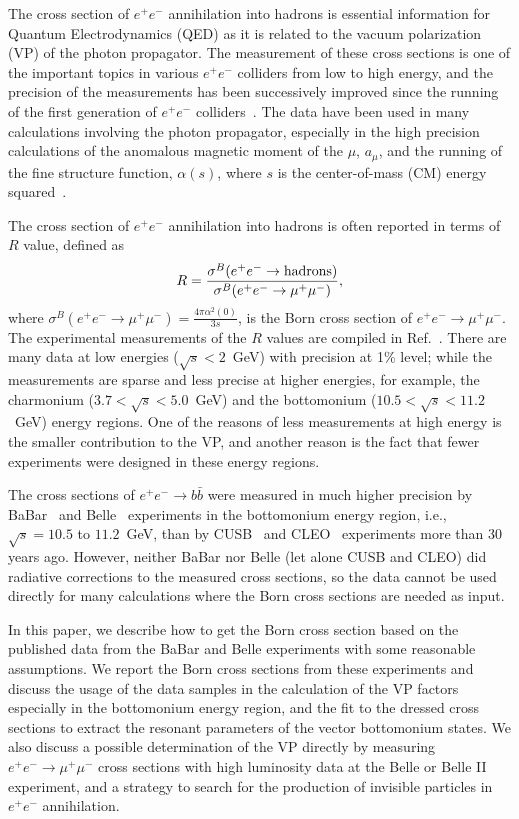 \documentclass[aps,showpacs,superscriptaddress,preprint,tightenlines]{revtex4}
\newcommand{\EE}{e^+e^-}
\newcommand{\MM}{\mu^+\mu^-}
\newcommand{\bbb}{b\bar{b}}
\begin{document}
The cross section of $\EE$ annihilation into hadrons is essential
information for Quantum Electrodynamics (QED) as it is related to the vacuum polarization (VP) of
the photon propagator. The measurement of these cross sections is
one of the important topics in various $\EE$ colliders from low
to high energy, and the precision of the measurements has been
successively improved since the running of the first
generation of $\EE$ colliders~\cite{experiments}. The data have been
used in many calculations involving the photon propagator,
especially in the high precision calculations of the anomalous
magnetic moment of the $\mu$, $a_\mu$, and the running of the fine
structure function, $\alpha(s)$, where $s$ is the center-of-mass 
(CM) energy squared~\cite{Davier,Teubner,ref-ask-3-fred}.

The cross section of $\EE$ annihilation into hadrons is often
reported in terms of $R$ value, defined as
\begin{equation}\label{define_r}
 R=\frac{\sigma^B(\EE\to {\rm hadrons})}{\sigma^B(\EE\to \MM)},
\end{equation}
where $\sigma^B(\EE\to \MM)=\frac{4\pi\alpha^2(0)}{3s}$, is the
Born cross section of $\EE\to \MM$. The experimental measurements
of the $R$ values are compiled in Ref.~\cite{experiments}. There
are many data at low energies ($\sqrt{s}<2$~GeV) with precision at
1\% level; while the measurements are sparse and less precise at
higher energies, for example, the charmonium
($3.7<\sqrt{s}<5.0$~GeV) and the bottomonium
($10.5<\sqrt{s}<11.2$~GeV) energy regions. One of the reasons of
less measurements at high energy is the smaller contribution to
the VP, and another reason is the fact that
fewer experiments were designed in these energy regions.

The cross sections of $\EE\to \bbb$ were measured in
much higher precision by BaBar~\cite{babar_rb} and
Belle~\cite{belle_rb} experiments in the bottomonium energy
region, i.e., $\sqrt{s}=10.5$ to $11.2$~GeV, than by
CUSB~\cite{CUSB} and CLEO~\cite{CLEO} experiments more than 30
years ago. However, neither BaBar nor Belle (let alone CUSB and
CLEO) did radiative corrections to the measured cross sections, so
the data cannot be used directly for many calculations where the
Born cross sections are needed as input.

In this paper, we describe how to get the Born cross section based
on the published data from the BaBar and Belle experiments with some
reasonable assumptions. We report the Born cross sections from
these experiments and discuss the usage of the data samples in 
the calculation of the
VP factors especially in the bottomonium energy
region, and the fit to the dressed cross sections to extract the 
resonant parameters of the vector bottomonium states.
We also discuss a possible determination of the VP directly 
by measuring $\EE\to \MM$ cross sections
with high luminosity data at the Belle or Belle II experiment, and
a strategy to search for the production of invisible particles in
$\EE$ annihilation.
\end{document}
